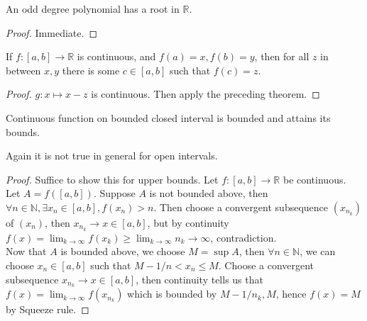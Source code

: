 \begin{corollary}
    An odd degree polynomial has a root in $\mathbb R$.
\end{corollary}
\begin{proof}
    Immediate.
\end{proof}
\begin{corollary}
    If $f:[a,b]\to\mathbb R$ is continuous, and $f(a)=x,f(b)=y$, then for all $z$ in between $x,y$ there is some $c\in [a,b]$ such that $f(c)=z$.
\end{corollary}
\begin{proof}
    $g:x\mapsto x-z$ is continuous.
    Then apply the preceding theorem.
\end{proof}
\begin{theorem}
    Continuous function on bounded closed interval is bounded and attains its bounds.
\end{theorem}
Again it is not true in general for open intervals.
\begin{proof}
    Suffice to show this for upper bounds.
    Let $f:[a,b]\to\mathbb R$ be continuous.
    Let $A=f([a,b])$.
    Suppose $A$ is not bounded above, then $\forall n\in\mathbb N,\exists x_n\in[a,b],f(x_n)>n$.
    Then choose a convergent subsequence $(x_{n_k})$ of $(x_n)$, then $x_{n_k}\to x\in [a,b]$, but by continuity $f(x)=\lim_{k\to\infty}f(x_k)\ge\lim_{k\to\infty}n_k\to\infty$, contradiction.\\
    Now that $A$ is bounded above, we choose $M=\sup A$, then $\forall n\in\mathbb N$, we can choose $x_n\in [a,b]$ such that $M-1/n<x_n\le M$.
    Choose a convergent subsequence $x_{n_k}\to x\in [a,b]$, then continuity tells us that $f(x)=\lim_{k\to\infty}f(x_{n_k})$ which is bounded by $M-1/n_k,M$, hence $f(x)=M$ by Squeeze rule.
\end{proof}

